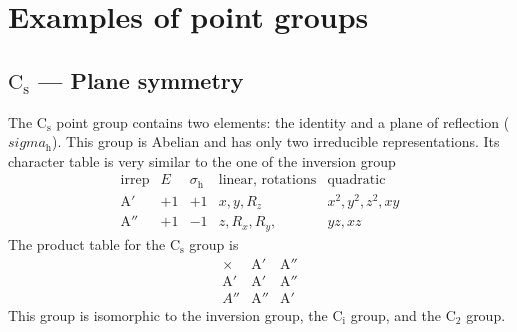 \documentclass[../Main/chem532-notes.tex]{subfiles}
\begin{document}
\section{Examples of point groups}
\subsection{$\mathrm{C_s}$ --- Plane symmetry}
The $\mathrm{C_s}$ point group contains two elements: the identity and a plane of reflection ($sigma_\mathrm{h}$).
This group is Abelian and has only two irreducible representations.
Its character table is very similar to the one of the inversion group
\begin{equation}
   \begin{array}{c|cccc}
          \text{irrep} & E & \sigma_\mathrm{h} & \text{linear, rotations} &  \text{quadratic} \\
   \hline
     \mathrm{A}' & +1 & +1 & x,y, R_z & x^2, y^2, z^2, xy\\
     \mathrm{A}'' & +1 & -1 & z, R_x, R_y, & yz, xz
   \end{array}
\end{equation}
The product table for the $\mathrm{C_s}$ group is
\begin{equation}
   \begin{array}{c|cc} %
        \times  &\mathrm{A}'  & \mathrm{A}'' \\
   \hline
     \mathrm{A}'  & \mathrm{A}' & \mathrm{A}'' \\
      {A}'' & \mathrm{A}'' & \mathrm{A}' 
   \end{array}
\end{equation}
This group is isomorphic to the inversion group, the $\mathrm{C_i}$ group, and the $\mathrm{C_2}$ group.
\end{document}

